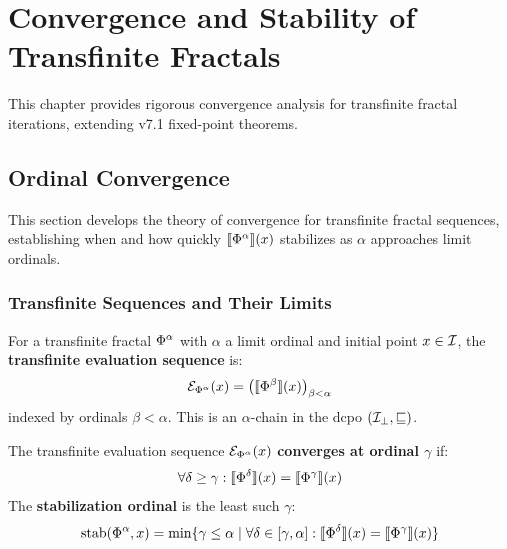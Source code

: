 \chapter{Convergence and Stability of Transfinite Fractals}
\label{ch:convergence-stability}

\begin{tcolorbox}[colback=blue!5!white,colframe=blue!75!black,title=\vnewthree]
This chapter provides rigorous convergence analysis for transfinite fractal iterations, extending v7.1 fixed-point theorems.
\end{tcolorbox}

\section{Ordinal Convergence}
\label{sec:ordinal-convergence}

\begin{tcolorbox}[colback=blue!5!white,colframe=blue!75!black,title=\vnewthree]
This section develops the theory of convergence for transfinite fractal sequences, establishing when and how quickly $\llbracket \Phi^{\alpha} \rrbracket(x)$ stabilizes as $\alpha$ approaches limit ordinals.
\end{tcolorbox}

\subsection{Transfinite Sequences and Their Limits}

\begin{definition}
\label{def:transfinite-eval-seq}
For a transfinite fractal $\Phi^{\alpha}$ with $\alpha$ a limit ordinal and initial point $x \in \mathcal{I}$, the \textbf{transfinite evaluation sequence} is:
\[
\mathcal{E}_{\Phi^{\alpha}}(x) = \left(\llbracket \Phi^{\beta} \rrbracket(x)\right)_{\beta < \alpha}
\]
indexed by ordinals $\beta < \alpha$. This is an $\alpha$-chain in the dcpo $(\mathcal{I}_\bot, \sqsubseteq)$.
\end{definition}

\begin{definition}
\label{def:ordinal-convergence}
The transfinite evaluation sequence $\mathcal{E}_{\Phi^{\alpha}}(x)$ \textbf{converges at ordinal $\gamma$} if:
\[
\forall \delta \geq \gamma : \llbracket \Phi^{\delta} \rrbracket(x) = \llbracket \Phi^{\gamma} \rrbracket(x)
\]
The \textbf{stabilization ordinal} is the least such $\gamma$:
\[
\mathrm{stab}(\Phi^{\alpha}, x) = \min\{\gamma \leq \alpha \mid \forall \delta \in [\gamma, \alpha] : \llbracket \Phi^{\delta} \rrbracket(x) = \llbracket \Phi^{\gamma} \rrbracket(x)\}
\]
\end{definition}

